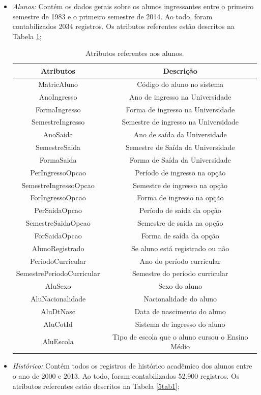 \begin{itemize}
	\item \textit{Alunos:} Contém os dados gerais sobre os alunos ingressantes entre o primeiro semestre de 1983 e o primeiro semestre de 2014. Ao todo, foram contabilizados 2034 registros. Os atributos referentes estão descritos na Tabela \ref{5tab};
	\begin{longtable}{c|c}
		
		\caption{Atributos referentes aos alunos.} 	\label{5tab}\\
		\hline
		Atributos & Descrição\\
		\hline
			MatricAluno & Código do aluno no sistema\\
			AnoIngresso & Ano de ingresso na Universidade\\
			FormaIngresso & Forma de ingresso na Universidade\\
			SemestreIngresso & Semestre de ingresso na Universidade\\
			AnoSaida & Ano de saída da Universidade\\
			SemestreSaida & Semestre de Saída da Universidade\\
			FormaSaida & Forma de Saída da Universidade\\
			PerIngressoOpcao & Período de ingresso na opção\\
			SemestreIngressoOpcao & Semestre de ingresso na opção\\ 
			ForIngressoOpcao & Forma de ingresso na opção\\
			PerSaidaOpcao & Período de saída da opção\\
			SemestreSaidaOpcao & Semestre de saída na opção\\
			ForSaidaOpcao & Forma de saída da opção\\
			AlunoRegistrado & Se aluno está registrado ou não\\
			PeriodoCurricular & Ano do período curricular\\
			SemestrePeriodoCurricular & Semestre do período curricular\\
			AluSexo & Sexo do aluno\\
			AluNacionalidade & Nacionalidade do aluno\\
			AluDtNasc & Data de nascimento do aluno\\
			AluCotId & Sistema de ingresso do aluno\\
			AluEscola & Tipo de escola que o aluno cursou o Ensino Médio\\
		\hline
	\end{longtable}
	\item \textit{Histórico:} Contém todos os registros de histórico acadêmico dos alunos entre o ano de 2000 e 2013. Ao todo, foram contabilizados 52.900 registros. Os atributos referentes estão descritos na Tabela \ref{5tab1};
		\begin{longtable}{c|c}
			

\end{longtable}
\end{itemize}
